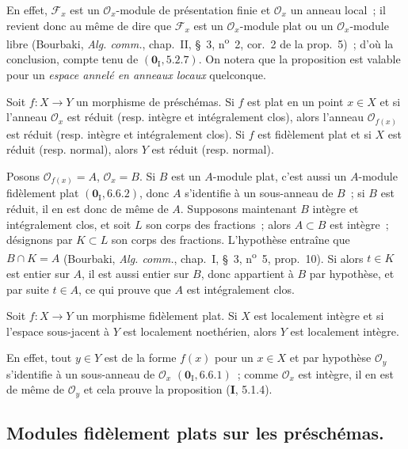 En effet, $\mathscr F_x$ est un $\mathcal O_x$-module de présentation finie
et $\mathcal O_x$ un anneau local~; il revient donc au même de dire que
$\mathscr F_x$ est un $\mathcal O_x$-module plat ou un $\mathcal O_x$-module
libre (Bourbaki, \emph{Alg. comm.}, chap.~II, \S~3,
n\textsuperscript{o}~2, cor.~2 de la prop.~5)~; d'où la conclusion, compte
tenu de $(\mathbf{0}_{\mathrm I},5.2.7)$. On notera que la proposition est valable pour
un \emph{espace annelé en anneaux locaux} quelconque.

\begin{proposition}[2.1.13]
\label{IV.2.1.13-fr}
Soit $f:X\to Y$ un morphisme de préschémas. Si $f$ est plat en un point
$x\in X$ et si l'anneau $\mathcal O_x$ est réduit (\textup{resp.} intègre et
intégralement clos), alors l'anneau $\mathcal O_{f(x)}$
est réduit (\textup{resp.} intègre et intégralement clos). Si $f$ est fidèlement plat
et si $X$ est réduit (\textup{resp.} normal), alors $Y$ est réduit (\textup{resp.} normal).
\end{proposition}

Posons $\mathcal O_{f(x)}=A$, $\mathcal O_x=B$. Si $B$ est un $A$-module
plat, c'est aussi un $A$-module fidèlement plat $(\mathbf{0}_{\mathrm I},6.6.2)$, donc
$A$ s'identifie à un sous-anneau de $B$~; si $B$ est réduit, il en est donc de
même de $A$. Supposons maintenant $B$ intègre et intégralement clos, et soit
$L$ son corps des fractions~; alors $A\subset B$ est intègre~; désignons par
$K\subset L$ son corps des fractions. L'hypothèse entraîne que
$B\cap K=A$ (Bourbaki, \emph{Alg. comm.}, chap.~I, \S~3,
n\textsuperscript{o}~5, prop.~10). Si alors $t\in K$ est entier sur $A$, il
est aussi entier sur $B$, donc appartient à $B$ par hypothèse, et par suite
$t\in A$, ce qui prouve que $A$ est intégralement clos.

\begin{proposition}[2.1.14]
\label{IV.2.1.14-fr}
Soit $f:X\to Y$ un morphisme fidèlement plat. Si $X$ est localement intègre
et si l'espace sous-jacent à $Y$ est localement noethérien, alors $Y$ est
localement intègre.
\end{proposition}

En effet, tout $y\in Y$ est de la forme $f(x)$ pour un $x\in X$ et par
hypothèse $\mathcal O_y$ s'identifie à un sous-anneau de $\mathcal O_x$
$(\mathbf{0}_{\mathrm I},6.6.1)$~; comme $\mathcal O_x$ est intègre, il en est de même
de $\mathcal O_y$ et cela prouve la proposition (\textbf{I}, 5.1.4).

\subsection{Modules fidèlement plats sur les préschémas.}
\label{subsection:IV.2.2-fr}

